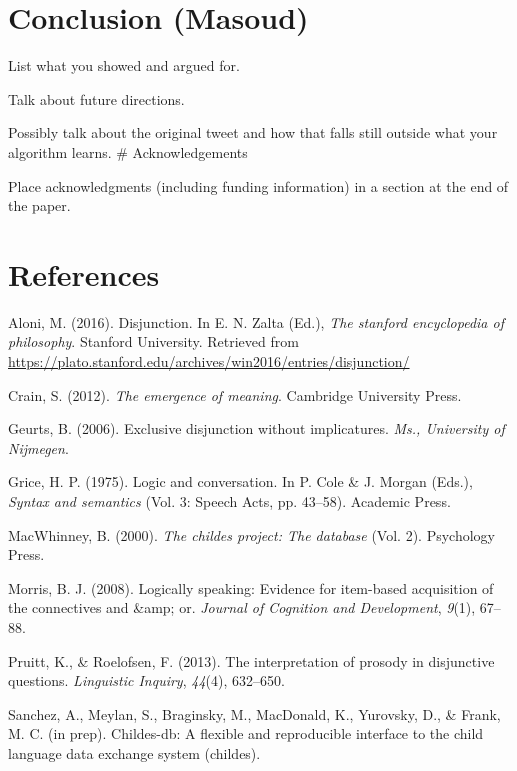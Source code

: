 \documentclass[10pt, letterpaper]{article}
\begin{document}
\section{Conclusion (Masoud)}\label{conclusion-masoud}

List what you showed and argued for.

Talk about future directions.

Possibly talk about the original tweet and how that falls still outside
what your algorithm learns. \# Acknowledgements

Place acknowledgments (including funding information) in a section at
the end of the paper.

\section{References}\label{references}

\setlength{\parindent}{-0.1in} \setlength{\leftskip}{0.125in} \noindent

\hypertarget{refs}{}
\hypertarget{ref-Aloni2016}{}
Aloni, M. (2016). Disjunction. In E. N. Zalta (Ed.), \emph{The stanford
encyclopedia of philosophy}. Stanford University. Retrieved from
\url{https://plato.stanford.edu/archives/win2016/entries/disjunction/}

\hypertarget{ref-crain2012emergence}{}
Crain, S. (2012). \emph{The emergence of meaning}. Cambridge University
Press.

\hypertarget{ref-geurts2006exclusive}{}
Geurts, B. (2006). Exclusive disjunction without implicatures.
\emph{Ms., University of Nijmegen}.

\hypertarget{ref-grice1975logicconvo}{}
Grice, H. P. (1975). Logic and conversation. In P. Cole \& J. Morgan
(Eds.), \emph{Syntax and semantics} (Vol. 3: Speech Acts, pp. 43--58).
Academic Press.

\hypertarget{ref-macwhinney2000childes}{}
MacWhinney, B. (2000). \emph{The childes project: The database} (Vol.
2). Psychology Press.

\hypertarget{ref-morris2008logically}{}
Morris, B. J. (2008). Logically speaking: Evidence for item-based
acquisition of the connectives and \&amp; or. \emph{Journal of Cognition
and Development}, \emph{9}(1), 67--88.

\hypertarget{ref-pruitt2013interpretation}{}
Pruitt, K., \& Roelofsen, F. (2013). The interpretation of prosody in
disjunctive questions. \emph{Linguistic Inquiry}, \emph{44}(4),
632--650.

\hypertarget{ref-childesdb}{}
Sanchez, A., Meylan, S., Braginsky, M., MacDonald, K., Yurovsky, D., \&
Frank, M. C. (in prep). Childes-db: A flexible and reproducible
interface to the child language data exchange system (childes).
\end{document}
